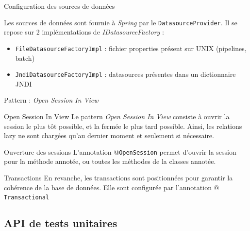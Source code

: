 \documentclass[compact]{beamer}%
\begin{document}
\begin{frame}{Configuration des sources de données}

	Les sources de données sont fournie à \emph{Spring} par le \texttt{DatasourceProvider}. Il se repose sur 2 implémentations de \emph{IDatasourceFactory} :
	\begin{itemize}
	\item \texttt{FileDatasourceFactoryImpl} : fichier properties présent sur UNIX (pipelines, batch)
	\item \texttt{JndiDatasourceFactoryImpl} : datasources présentes dans un dictionnaire JNDI
	\end{itemize}

\end{frame}

\begin{frame}{Pattern : \emph{Open Session In View}}

	\begin{block}{Open Session In View}
	Le pattern \emph{Open Session In View} consiste à ouvrir la session le plus tôt possible, et la fermée le plus tard possible. Ainsi, les relations lazy ne sont chargées qu'au dernier moment et seulement si nécessaire.
	\end{block}
	
	\pause
	\begin{block}{Ouverture des sessions}
	L'annotation \texttt{$@$OpenSession} permet d'ouvrir la session pour la méthode annotée, ou toutes les méthodes de la classes annotée.
	\end{block}
	
	\pause
	\begin{block}{Transactions}
	En revanche, les transactions sont positionnées pour garantir la cohérence de la base de données. Elle sont configurée par l'annotation \texttt{$@$Transactional}
	\end{block}

\end{frame}


\subsection{API de tests unitaires}
\end{document}
